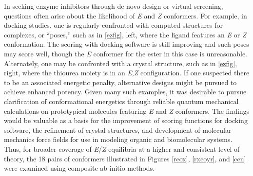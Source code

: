 \documentclass[12pt]{report}
\begin{document}
In seeking enzyme inhibitors through de novo design or virtual screening,\cite{klebe,jez} questions often arise about the likelihood of \textit{E} and \textit{Z} conformers. For example, in docking studies, one is regularly confronted with computed structures for complexes, or ``poses,'' such as in \cref{ezfig}, left, where the ligand features an \textit{E} or \textit{Z} conformation. The scoring with docking software is still improving and such poses may score well,\cite{nichols} though the \textit{E} conformer for the ester in this case is unreasonable.\cite{brameld} Alternately, one may be confronted with a crystal structure, such as in \cref{ezfig}, right, where the thiourea moiety is in an \textit{E},\textit{Z} configuration.\cite{ren} If one suspected there to be an associated energetic penalty, alternative designs might be pursued to achieve enhanced potency. Given many such examples, it was desirable to pursue clarification of conformational energetics through reliable quantum mechanical calculations on prototypical molecules featuring \textit{E} and \textit{Z} conformers. The findings would be valuable as a basis for the improvement of scoring functions for docking software,\cite{leach} the refinement of crystal structures, and development of molecular mechanics force fields for use in modeling organic and biomolecular systems.\cite{ponder,jjez} Thus, for broader coverage of \textit{E}/\textit{Z} equilibria at a higher and consistent level of theory, the 18 pairs of conformers illustrated in Figures \ref{rcox}, \ref{rxcoyr}, and \ref{ccn} were examined using composite ab initio methods.
\end{document}
